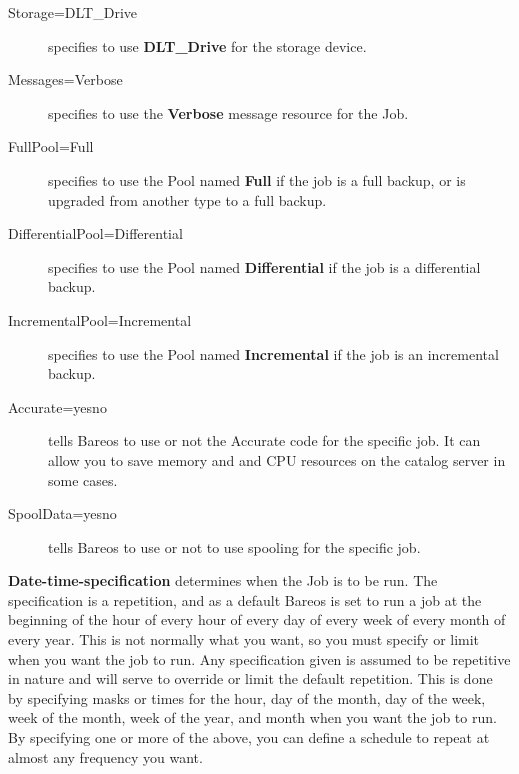 {\begin{description}
\item [Storage=DLT\_Drive]
specifies to use {\bf DLT\_Drive} for  the storage device.

\item [Messages=Verbose]
specifies to use the {\bf Verbose}  message resource for the Job.

\item [FullPool=Full]
specifies to use the Pool named {\bf Full}  if the job is a full backup, or
is upgraded from another type  to a full backup.

\item [DifferentialPool=Differential]
specifies to use the Pool named {\bf Differential} if the job is a
differential  backup.

\item [IncrementalPool=Incremental]
specifies to use the Pool  named {\bf Incremental} if the job is an
incremental  backup.

\item [Accurate=yes{\textbar}no]
tells Bareos to use or not the Accurate code for the specific job. It can
allow you to save memory and and CPU resources on the catalog server in some
cases.

\item [SpoolData=yes{\textbar}no]
tells Bareos to use or not to use spooling for the specific job.

\end{description}

{\bf Date-time-specification} determines when the  Job is to be run. The
specification is a repetition, and as  a default Bareos is set to run a job at
the beginning of the  hour of every hour of every day of every week of every
month  of every year. This is not normally what you want, so you  must specify
or limit when you want the job to run. Any  specification given is assumed to
be repetitive in nature and  will serve to override or limit the default
repetition. This  is done by specifying masks or times for the hour, day of the
month, day of the week, week of the month, week of the year,  and month when
you want the job to run. By specifying one or  more of the above, you can
define a schedule to repeat at  almost any frequency you want.

}
